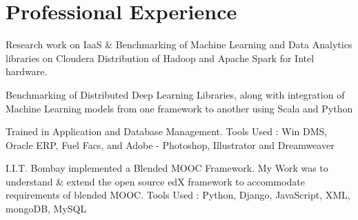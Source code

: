 \documentclass[hidelinks,letterpaper]{deedy-resume-openfont} %
\begin{document}
\begin{minipage}[t]{0.66\textwidth} %




\section{Professional Experience}
{}
Research work on IaaS \& Benchmarking of Machine Learning and Data Analytics libraries on Cloudera Distribution of Hadoop and Apache Spark for Intel hardware.


Benchmarking of Distributed Deep Learning Libraries, along with integration of Machine Learning models from one framework to another using Scala and Python



Trained in Application and Database Management. Tools Used : Win DMS, Oracle ERP, Fuel Facs, and Adobe - Photoshop, Illustrator and Dreamweaver


I.I.T. Bombay implemented a Blended MOOC Framework. My Work was to understand \& extend the open source edX framework to accommodate requirements of blended MOOC. Tools Used : Python, Django, JavaScript, XML, mongoDB, MySQL


\end{minipage}
\end{document}
